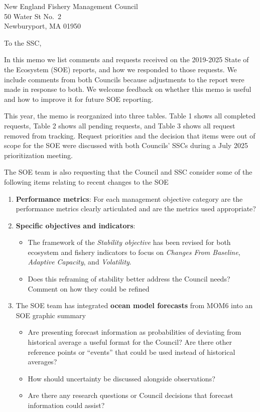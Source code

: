 \documentclass[10pt,]{letter}
\date{20 March, 2026}
\providecommand{\tightlist}{%
  \setlength{\itemsep}{0pt}\setlength{\parskip}{0pt}}
\begin{document}
\begin{letter}{New England Fishery Management Council\\50 Water St
No.~2\\Newburyport, MA 01950}
\opening{To the SSC,}

In this memo we list comments and requests received on the 2019-2025
State of the Ecosystem (SOE) reports, and how we responded to those
requests. We include comments from both Councils because adjustments to
the report were made in response to both. We welcome feedback on whether
this memo is useful and how to improve it for future SOE reporting.

This year, the memo is reorganized into three tables. Table 1 shows all
completed requests, Table 2 shows all pending requests, and Table 3
shows all request removed from tracking. Request priorities and the
decision that items were out of scope for the SOE were discussed with
both Councils' SSCs during a July 2025 prioritization meeting.

The SOE team is also requesting that the Council and SSC consider some
of the following items relating to recent changes to the SOE

\begin{enumerate}
\def\labelenumi{\arabic{enumi}.}
\item
  \textbf{Performance metrics}: For each management objective category
  are the performance metrics clearly articulated and are the metrics
  used appropriate?
\item
  \textbf{Specific objectives and indicators}:

  \begin{itemize}
  \tightlist
  \item
    The framework of the \emph{Stability objective} has been revised for
    both ecosystem and fishery indicators to focus on \emph{Changes From
    Baseline}, \emph{Adaptive Capacity}, and \emph{Volatility}.
  \item
    Does this reframing of stability better address the Council needs?
    Comment on how they could be refined
  \end{itemize}
\item
  The SOE team has integrated \textbf{ocean model forecasts} from MOM6
  into an SOE graphic summary

  \begin{itemize}
  \tightlist
  \item
    Are presenting forecast information as probabilities of deviating
    from historical average a useful format for the Council? Are there
    other reference points or ``events'' that could be used instead of
    historical averages?
  \item
    How should uncertainty be discussed alongside observations?
  \item
    Are there any research questions or Council decisions that forecast
    information could assist?
  \end{itemize}
\end{enumerate}


\end{letter}
\end{document}
